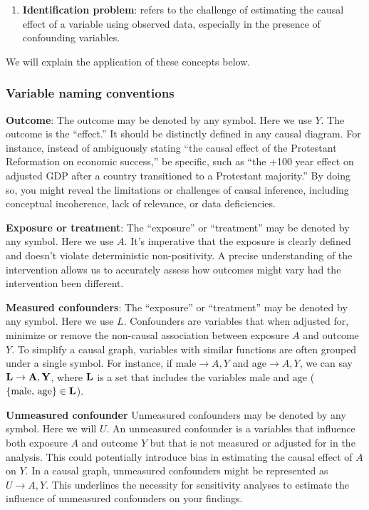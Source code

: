 \documentclass[
  singlecolumn]{report}
\providecommand{\tightlist}{%
  \setlength{\itemsep}{0pt}\setlength{\parskip}{0pt}}\usepackage{longtable,booktabs,array}
\begin{document}
\begin{enumerate}
\def\labelenumi{\arabic{enumi}.}
\setcounter{enumi}{9}
\tightlist
\item
  \textbf{Identification problem}: refers to the challenge of estimating
  the causal effect of a variable using observed data, especially in the
  presence of confounding variables.
\end{enumerate}

We will explain the application of these concepts below.

\hypertarget{variable-naming-conventions}{%
\subsubsection{Variable naming
conventions}\label{variable-naming-conventions}}

\textbf{Outcome}: The outcome may be denoted by any symbol. Here we use
\(Y\). The outcome is the ``effect.'' It should be distinctly defined in
any causal diagram. For instance, instead of ambiguously stating ``the
causal effect of the Protestant Reformation on economic success,'' be
specific, such as ``the +100 year effect on adjusted GDP after a country
transitioned to a Protestant majority.'' By doing so, you might reveal
the limitations or challenges of causal inference, including conceptual
incoherence, lack of relevance, or data deficiencies.

\textbf{Exposure or treatment}: The ``exposure'' or ``treatment'' may be
denoted by any symbol. Here we use \(A\). It's imperative that the
exposure is clearly defined and doesn't violate deterministic
non-positivity. A precise understanding of the intervention allows us to
accurately assess how outcomes might vary had the intervention been
different.

\textbf{Measured confounders}: The ``exposure'' or ``treatment'' may be
denoted by any symbol. Here we use \(L\). Confounders are variables that
when adjusted for, minimize or remove the non-causal association between
exposure \(A\) and outcome \(Y\). To simplify a causal graph, variables
with similar functions are often grouped under a single symbol. For
instance, if \(\text{male} \to A, Y\) and \(\text{age} \to A, Y\), we
can say \(\bf{L} \to A, Y\), where \(\bf{L}\) is a set that includes the
variables \(\text{male}\) and \(\text{age}\)
(\(\{\text{male, age}\}\in \bf{L}\)).

\textbf{Unmeasured confounder} Unmeasured confounders may be denoted by
any symbol. Here we will \(U\). An unmeasured confounder is a variables
that influence both exposure \(A\) and outcome \(Y\) but that is not
measured or adjusted for in the analysis. This could potentially
introduce bias in estimating the causal effect of \(A\) on \(Y\). In a
causal graph, unmeasured confounders might be represented as
\(U \to A, Y\). This underlines the necessity for sensitivity analyses
to estimate the influence of unmeasured confounders on your findings.
\end{document}
